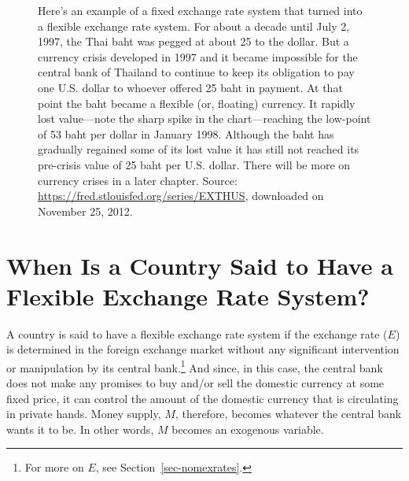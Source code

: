 \documentclass[
  letterpaper,
]{book}
\theoremstyle{plain}
\theoremstyle{remark}
\begin{document}
\begin{figure}


\caption{\label{fig-chart-thai-baht}Here's an example of a fixed
exchange rate system that turned into a flexible exchange rate system.
For about a decade until July 2, 1997, the Thai baht was pegged at about
25 to the dollar. But a currency crisis developed in 1997 and it became
impossible for the central bank of Thailand to continue to keep its
obligation to pay one U.S. dollar to whoever offered 25 baht in payment.
At that point the baht became a flexible (or, floating) currency. It
rapidly lost value---note the sharp spike in the chart---reaching the
low-point of 53 baht per dollar in January 1998. Although the baht has
gradually regained some of its lost value it has still not reached its
pre-crisis value of 25 baht per U.S. dollar. There will be more on
currency crises in a later chapter. Source:
\url{https://fred.stlouisfed.org/series/EXTHUS}, downloaded on November
25, 2012.}

\end{figure}%

\section{When Is a Country Said to Have a Flexible Exchange Rate
System?}\label{sec-flexexrates}

A country is said to have a flexible exchange rate
system if the exchange rate (\(E\)) is
determined in the foreign exchange market without any significant
intervention or manipulation by its central bank.\footnote{For more on
  \(E\), see Section~\ref{sec-nomexrates}.} And since, in this case, the
central bank does not make any promises to buy and/or sell the domestic
currency at some fixed price, it can control the amount of the domestic
currency that is circulating in private hands. Money supply, \(M\),
therefore, becomes whatever the central bank wants it to be. In other
words, \(M\) becomes an exogenous
variable.
\end{document}
